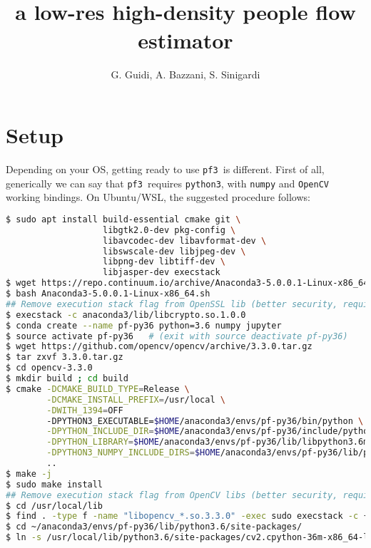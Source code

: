 \documentclass{article}
\title{\pf\\a low-res high-density people flow estimator}
\author{G. Guidi, A. Bazzani, S. Sinigardi}
\date{}
\def \pf{{\tt pf3 }}
\begin{document}
\maketitle

\section{Setup}
Depending on your OS, getting ready to use \pf is different.
First of all, generically we can say that \pf requires {\tt python3}, with {\tt numpy} and {\tt OpenCV} working bindings.
On Ubuntu/WSL, the suggested procedure follows:

\begin{lstlisting}[language=bash, caption=Install on Ubuntu]
$ sudo apt install build-essential cmake git \
                   libgtk2.0-dev pkg-config \
                   libavcodec-dev libavformat-dev \
                   libswscale-dev libjpeg-dev \
                   libpng-dev libtiff-dev \
                   libjasper-dev execstack
$ wget https://repo.continuum.io/archive/Anaconda3-5.0.0.1-Linux-x86_64.sh
$ bash Anaconda3-5.0.0.1-Linux-x86_64.sh
## Remove execution stack flag from OpenSSL lib (better security, required for WSL)
$ execstack -c anaconda3/lib/libcrypto.so.1.0.0
$ conda create --name pf-py36 python=3.6 numpy jupyter
$ source activate pf-py36   # (exit with source deactivate pf-py36)
$ wget https://github.com/opencv/opencv/archive/3.3.0.tar.gz
$ tar zxvf 3.3.0.tar.gz
$ cd opencv-3.3.0
$ mkdir build ; cd build
$ cmake -DCMAKE_BUILD_TYPE=Release \
        -DCMAKE_INSTALL_PREFIX=/usr/local \
        -DWITH_1394=OFF 
        -DPYTHON3_EXECUTABLE=$HOME/anaconda3/envs/pf-py36/bin/python \
        -DPYTHON_INCLUDE_DIR=$HOME/anaconda3/envs/pf-py36/include/python3.6m \
        -DPYTHON_LIBRARY=$HOME/anaconda3/envs/pf-py36/lib/libpython3.6m.so \
        -DPYTHON3_NUMPY_INCLUDE_DIRS=$HOME/anaconda3/envs/pf-py36/lib/python3.6/site-packages/numpy/core/include \
        ..
$ make -j
$ sudo make install
## Remove execution stack flag from OpenCV libs (better security, required for WSL)
$ cd /usr/local/lib
$ find . -type f -name "libopencv_*.so.3.3.0" -exec sudo execstack -c {} \;
$ cd ~/anaconda3/envs/pf-py36/lib/python3.6/site-packages/
$ ln -s /usr/local/lib/python3.6/site-packages/cv2.cpython-36m-x86_64-linux-gnu.so cv2.so
\end{lstlisting}
\end{document}
